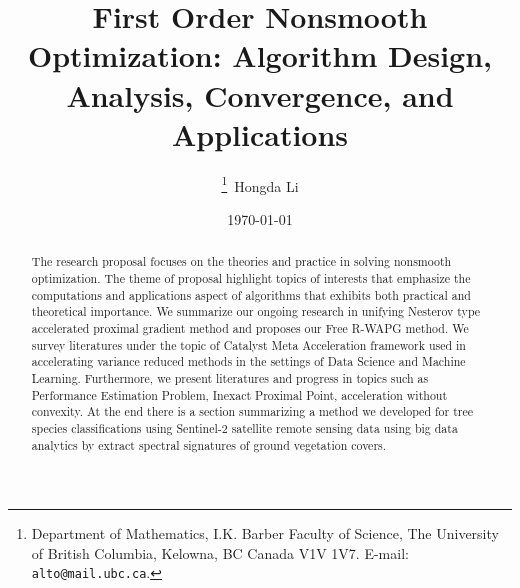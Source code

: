 \documentclass[12pt]{article}
\begin{document}
\title{
    {
        \selectfont 
        First Order Nonsmooth Optimization: 
        Algorithm Design, Analysis, Convergence, and Applications
    }
    }

\author{
    \thanks{Department of Mathematics, I.K. Barber Faculty of Science,
    The University of British Columbia, Kelowna, BC Canada V1V 1V7. 
    E-mail:  \texttt{alto@mail.ubc.ca}.}~Hongda Li
}

\date{\today}

\maketitle


\begin{abstract} 
    \noindent
    The research proposal focuses on the theories and practice in solving nonsmooth optimization. 
    The theme of proposal highlight topics of interests that emphasize the computations and applications aspect of algorithms that exhibits both practical and theoretical importance. 
    We summarize our ongoing research in unifying Nesterov type accelerated proximal gradient method and proposes our Free R-WAPG method. 
    We survey literatures under the topic of Catalyst Meta Acceleration framework used in accelerating variance reduced methods in the settings of Data Science and Machine Learning. 
    Furthermore, we present literatures and progress in topics such as Performance Estimation Problem, Inexact Proximal Point, acceleration without convexity. 
    At the end there is a section summarizing a method we developed for tree species classifications using Sentinel-2 satellite remote sensing data using big data analytics by extract spectral signatures of ground vegetation covers. 


\end{abstract}

\newpage
\tableofcontents
\end{document}
